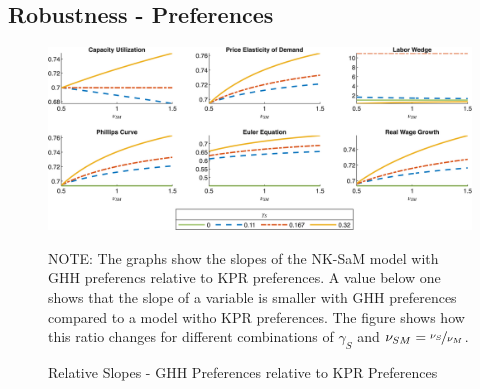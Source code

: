 \documentclass[12pt,3p,authoryear,review]{elsarticle}
\begin{document}
\subsection{Robustness - \cite{greenwoodInvestmentCapacityUtilization1988} Preferences}\label{sec:robust_ghh}%
\begin{figure}[h!]%
    \centering%
    \caption{Relative Slopes - GHH Preferences relative to KPR Preferences}\label{fig:app_slopes_robust_ghh}%
    \includegraphics[width=\textwidth]{fig_23_slopes_robust_ghh.png}\\%
    {\tiny \singlespacing NOTE: The graphs show the slopes of the NK-SaM model with GHH preferencs relative to KPR preferences. A value below one shows that the slope of a variable is smaller with GHH preferences compared to a model witho KPR preferences. The figure shows how this ratio changes for different combinations of $\gamma_S$ and $\nu_{SM} = \nicefrac{\nu_S}{\nu_M}$.\par}%
\end{figure}%
\end{document}
